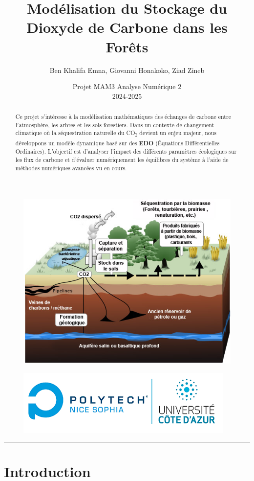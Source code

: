 \documentclass[12pt]{article}
\title{Modélisation du Stockage du Dioxyde de Carbone dans les Forêts}
\author{Ben Khalifa Emna, Giovanni Honakoko, Ziad Zineb }
\date{Projet MAM3 Analyse Numérique 2 \\ 2024-2025}
\theoremstyle{saav}
\begin{document}
		\maketitle
		\begin{figure}[h]
			\centering
			\includegraphics[width=0.6\linewidth]{images/schema_puit_de_carbone.jpg}
		\end{figure}
			\begin{abstract}
			\noindent
			Ce projet s'intéresse à la modélisation mathématiques des échanges de carbone entre l'atmosphère, les arbres et les sols forestiers. Dans un contexte de changement climatique où la séquestration naturelle du CO\textsubscript{2} devient un enjeu majeur, nous développons un modèle dynamique basé sur des \textbf{EDO} (Équations Différentielles Ordinaires). L'objectif est d'analyser l'impact des différents paramètres écologiques sur les flux de carbone et d'évaluer numériquement les équilibres du système à l'aide de méthodes numériques avancées vu en cours.
		\end{abstract}
		\begin{figure}[b]
			\raggedleft
			\includegraphics[width=0.5\linewidth]{images/logo_pns.png}
		\end{figure}
		\newpage
		\tableofcontents
	
		\rule{\linewidth}{0.4pt}
		
	\setlength{\intextsep}{12pt plus 2pt minus 2pt} %
	\setlength{\textfloatsep}{12pt plus 2pt minus 2pt} %
	\setlength{\parindent}{0pt} %
	\section{Introduction}
\end{document}
